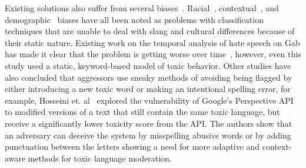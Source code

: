 Existing solutions also suffer from several biases~\cite{haimson2021disproportionate}.
Racial~\cite{sap2019risk}, contextual~\cite{zueva2020reducing}, and demographic~\cite{huang2020multilingual} biases have all been noted as problems with classification techniques that are unable to deal with slang and cultural differences because of their static nature.
Existing work on the temporal analysis of hate speech on Gab has made it clear that the problem is getting worse over time~\cite{mathew2020hate}, however, even this study used a static, keyword-based model of toxic behavior.
Other studies have also concluded that aggressors use sneaky methods of avoiding being flagged by either introducing a new toxic word or making an intentional spelling error, for example, Hosseini et. al~\cite{hosseini2017deceiving} explored the vulnerability of Google's Perspective API to modified versions of a text that still contain the same toxic language, but receive a significantly lower toxicity score from the API.
The authors show that an adversary can deceive the system by misspelling abusive words or by adding punctuation between the letters showing a need for more adaptive and context-aware methods for toxic language moderation.

